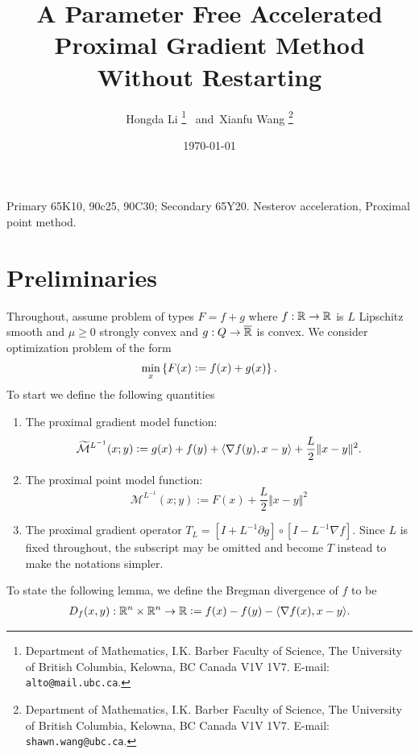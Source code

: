 \documentclass[12pt]{article}
\begin{document}
\title{{\selectfont 
        A Parameter Free Accelerated Proximal Gradient Method Without Restarting
    }}

\author{
    Hongda Li
    \thanks{Department of Mathematics, I.K. Barber Faculty of Science,
    The University of British Columbia, Kelowna, BC Canada V1V 1V7. E-mail:  \texttt{alto@mail.ubc.ca}.}~ and~Xianfu Wang
    \thanks{Department of Mathematics, I.K. Barber Faculty of Science,
    The University of British Columbia, Kelowna, BC Canada V1V 1V7. E-mail:  \texttt{shawn.wang@ubc.ca}.}
}

\date{\today}

\maketitle


\begin{abstract} 
    \noindent
    
    \cite{nesterov_lectures_2018}
\end{abstract}

Primary 65K10, 90c25, 90C30; Secondary 65Y20. 
 Nesterov acceleration, Proximal point method. 

\section{Preliminaries}
    Throughout, assume problem of types $F = f + g$ where $f: \mathbb R \rightarrow \mathbb R$ is $L$ Lipschitz smooth and $\mu \ge 0$ strongly convex and $g: Q \rightarrow \overline {\mathbb R}$ is convex. 
    We consider optimization problem of the form
    \begin{align*}
        \min_x \left\lbrace
            F(x) \vcentcolon= f(x) + g(x)
        \right\rbrace. 
    \end{align*}
    To start we define the following quantities
    \begin{enumerate}
        \item The proximal gradient model function: 
        $$
            \widetilde{\mathcal M}^{L^{-1}}
            (x; y) \vcentcolon=
            g(x) + f(y) + \langle \nabla f(y), x - y\rangle 
            + \frac{L}{2}\Vert x - y\Vert^2. 
        $$
        \item The proximal point model function: 
        $$
            \mathcal M^{L^{-1}}(x; y) := F(x) + \frac{L}{2}\Vert x - y\Vert^2
        $$
        \item The proximal gradient operator $T_L = [I + L^{-1}\partial g]\circ [I - L^{-1}\nabla f]$. Since $L$ is fixed throughout, the subscript may be omitted and become $T$ instead to make the notations simpler. 
    \end{enumerate}
    To state the following lemma, we define the Bregman divergence of $f$ to be 
    \begin{align*}
        D_f(x, y): \mathbb R^n \times \mathbb R^n \rightarrow \mathbb R 
        \vcentcolon= f(x) - f(y) - \langle \nabla f(x), x - y\rangle. 
    \end{align*}
    
\end{document}
